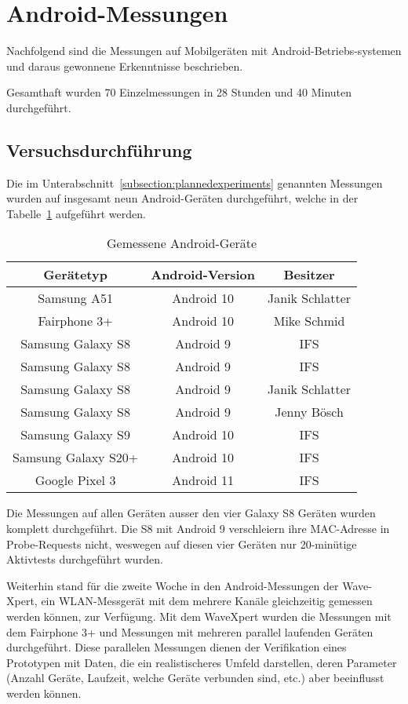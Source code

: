 \section{Android-Messungen
\label{section:androidmeasurements}}
Nachfolgend sind die Messungen auf Mobilgeräten mit Android-Betriebs-systemen 
und daraus gewonnene Erkenntnisse beschrieben.

Gesamthaft wurden 70 Einzelmessungen in 28 Stunden und 40 Minuten durchgeführt.

\subsection{Versuchsdurchführung}
Die im Unterabschnitt~\ref{subsection:plannedexperiments} genannten
Messungen wurden auf insgesamt neun Android-Geräten durchgeführt, welche in der 
Tabelle~\ref{table:measuredandroiddevices} aufgeführt werden.

\begin{table}[h!]
	\centering
	\begin{tabular}{|c|c|c|}
		\hline
        \textbf{Gerätetyp} & \textbf{Android-Version} & \textbf{Besitzer} \\
        \hline
        Samsung A51 & Android 10 & Janik Schlatter \\
        Fairphone 3+ & Android 10 & Mike Schmid \\
        Samsung Galaxy S8 & Android 9 & IFS \\
        Samsung Galaxy S8 & Android 9 & IFS \\
        Samsung Galaxy S8 & Android 9 & Janik Schlatter \\
        Samsung Galaxy S8 & Android 9 & Jenny Bösch \\
        Samsung Galaxy S9 & Android 10 & IFS \\
        Samsung Galaxy S20+ &  Android 10 & IFS \\
        Google Pixel 3  & Android 11 & IFS \\
        \hline
    \end{tabular}
    \caption{Gemessene Android-Geräte
    \label{table:measuredandroiddevices}}  
\end{table}

Die Messungen auf allen Geräten ausser den vier Galaxy S8 Geräten wurden komplett
durchgeführt. Die S8 mit Android 9 verschleiern ihre MAC-Adresse in Probe-Requests
nicht, weswegen auf diesen vier Geräten nur 20-minütige Aktivtests durchgeführt
wurden. 

Weiterhin stand für die zweite Woche in den Android-Messungen der Wave-Xpert, 
ein WLAN-Messgerät mit dem mehrere Kanäle gleichzeitig gemessen werden können,
zur Verfügung. Mit dem WaveXpert wurden die Messungen mit dem Fairphone 3+ und 
Messungen mit mehreren parallel laufenden Geräten durchgeführt.
Diese parallelen Messungen dienen der Verifikation eines Prototypen mit Daten, 
die ein realistischeres Umfeld darstellen, deren Parameter (Anzahl Geräte, 
Laufzeit, welche Geräte verbunden sind, etc.) aber beeinflusst werden können.

